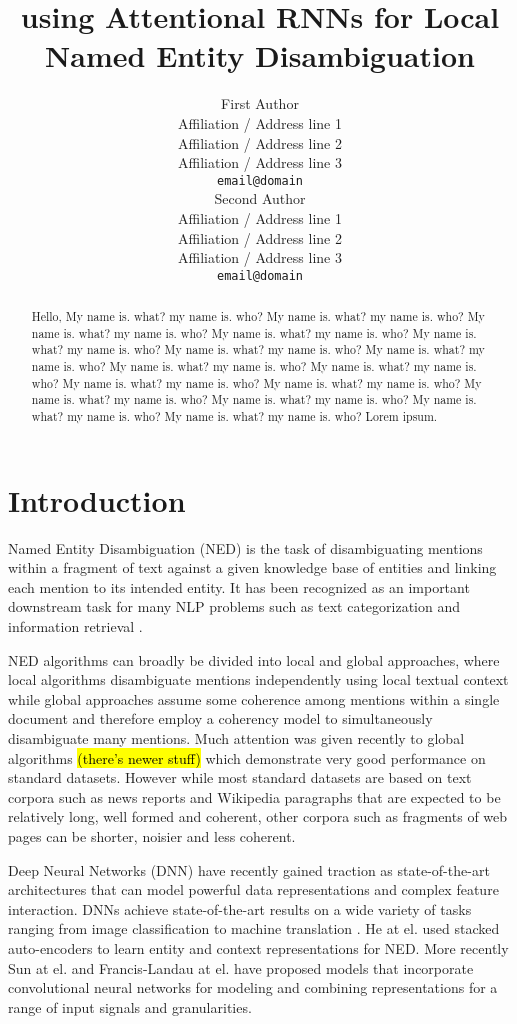 \documentclass[11pt]{article}
\title{using Attentional RNNs for Local Named Entity Disambiguation}
\author{First Author \\
	Affiliation / Address line 1 \\
	Affiliation / Address line 2 \\
	Affiliation / Address line 3 \\
	{\tt email@domain} \\\And
	Second Author \\
	Affiliation / Address line 1 \\
	Affiliation / Address line 2 \\
	Affiliation / Address line 3 \\
	{\tt email@domain} \\}
\date{}
\begin{document}
	\maketitle
	\begin{abstract}
		Hello, My name is. what? my name is. who?
		My name is. what? my name is. who?
		My name is. what? my name is. who?
		My name is. what? my name is. who?
		My name is. what? my name is. who?
		My name is. what? my name is. who?
		My name is. what? my name is. who?
		My name is. what? my name is. who?
		My name is. what? my name is. who?
		My name is. what? my name is. who?
		My name is. what? my name is. who?
		My name is. what? my name is. who?
		My name is. what? my name is. who?
		My name is. what? my name is. who?
		My name is. what? my name is. who? Lorem ipsum.
	\end{abstract}
	
	\section{Introduction}
	
	Named Entity Disambiguation (NED) is the task of disambiguating mentions within a fragment of text against a given knowledge base of entities and linking each mention to its intended entity. It has been recognized as an important downstream task for many NLP problems such as text categorization \cite{gabrilovich2007computing} and information retrieval \cite{dalton2014entity}. 
	
	NED algorithms can broadly be divided into local and global approaches, where local algorithms disambiguate mentions independently using local textual context while global approaches assume some coherence among mentions within a single document and therefore employ a coherency model to simultaneously disambiguate many mentions. Much attention was given recently to global algorithms \cite{ratinov2011local,guo2014entity,pershina2015personalized} \hl{(there's newer stuff)} which demonstrate very good performance on standard datasets. However while most standard datasets are based on text corpora such as news reports and Wikipedia paragraphs that are expected to be relatively long, well formed and coherent, other corpora such as fragments of web pages can be shorter, noisier and less coherent.
	
	Deep Neural Networks (DNN) have recently gained traction as state-of-the-art architectures that can model powerful data representations and complex feature interaction. DNNs achieve state-of-the-art results on a wide variety of tasks ranging from image classification \cite{krizhevsky2012imagenet} to machine translation \cite{bahdanau2014neural}. He at el. \cite{he2013learning} used stacked auto-encoders to learn entity and context representations for NED. More recently Sun at el. and Francis-Landau at el. \cite{sun2015modeling,francis2016capturing} have proposed models that incorporate convolutional neural networks for modeling and combining representations for a range of input signals and granularities. 
	
\end{document}
